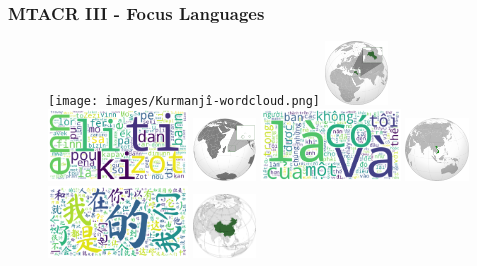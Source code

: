 \documentclass[aspectratio=169]{beamer}
\begin{document}
\begin{frame}[fragile]
	\frametitle{MTACR III - Focus Languages}
    \begin{figure}
	    \centering
	    \texttt{[image: images/Kurmanjî-wordcloud.png]}%
        \includegraphics[width=0.15\textwidth]{images/Kurdistan-Wikipedia-Position.png}%
        \includegraphics[width=0.33\textwidth]{images/Morisien-wordcloud.png}%
        \includegraphics[width=0.15\textwidth]{images/Mauritius-Wikipedia-Position.png}
        \includegraphics[width=0.33\textwidth]{images/Vietnamese-wordcloud.png}%
        \includegraphics[width=0.15\textwidth]{images/Vietnam-Wikipedia-Position.png}%
        \includegraphics[width=0.33\textwidth]{images/Chinese-wordcloud.png}%
        \includegraphics[width=0.15\textwidth]{images/China-Wikipedia-Position.png}
	\end{figure}
\end{frame}
\end{document}
